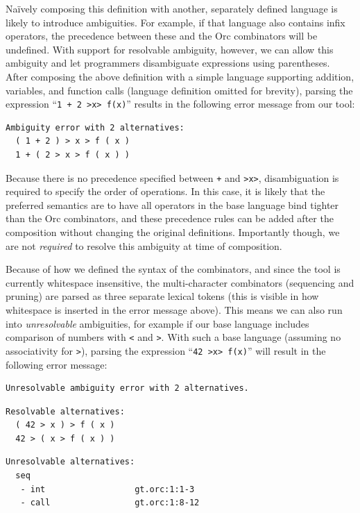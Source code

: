 \documentclass[runningheads]{llncs}
\newcommand{\ocaml}{\lstinline[language={[objective]caml}]}
\begin{document}
\noindent
Na\"{i}vely composing this definition with another, separately
defined language is likely to introduce ambiguities. For example,
if that language also contains infix operators, the precedence
between these and the Orc combinators will be undefined. With
support for resolvable ambiguity, however, we can allow this
ambiguity and let programmers disambiguate expressions using
parentheses. After composing the above definition with a simple
language supporting addition, variables, and function calls
(language definition omitted for brevity), parsing the expression
%
``\ocaml{1 + 2 >x> f(x)}''
%
results in the following error message from our tool:

{\small
\begin{lstlisting}[language={[objective]caml}]
Ambiguity error with 2 alternatives:
  ( 1 + 2 ) > x > f ( x )
  1 + ( 2 > x > f ( x ) )
\end{lstlisting}
}

\noindent
Because there is no precedence specified between \ocaml{+} and
\ocaml{>x>}, disambiguation is required to specify the order of
operations.
%
In this case, it is likely that the preferred semantics are to have
all operators in the base language bind tighter than the Orc
combinators, and these precedence rules can be added after the
composition without changing the original definitions. Importantly
though, we are not \emph{required} to resolve this ambiguity at
time of composition.

Because of how we defined the syntax of the combinators, and since
the tool is currently whitespace insensitive, the
multi-character combinators (sequencing and pruning) are parsed as
three separate lexical tokens (this is visible in how whitespace
is inserted in the error message above). This means we can also
run into \emph{unresolvable} ambiguities, for example if our base
language includes comparison of numbers with \ocaml{<} and
\ocaml{>}. With such a base language (assuming no associativity
for \ocaml{>}), parsing the expression
%
``\ocaml{42 >x> f(x)}''
%
will result in the following error message:

{\small
\begin{lstlisting}[language={[objective]caml}]
Unresolvable ambiguity error with 2 alternatives.
\end{lstlisting}

\begin{minipage}{.3\textwidth}
\begin{lstlisting}[language={[objective]caml}]
Resolvable alternatives:
  ( 42 > x ) > f ( x )
  42 > ( x > f ( x ) )
\end{lstlisting}
\end{minipage}
\hfill
\begin{minipage}{.5\textwidth}
\begin{lstlisting}[language={[objective]caml}]
Unresolvable alternatives:
  seq
   - int                  gt.orc:1:1-3
   - call                 gt.orc:1:8-12
\end{lstlisting}
\end{minipage}
}
\end{document}
